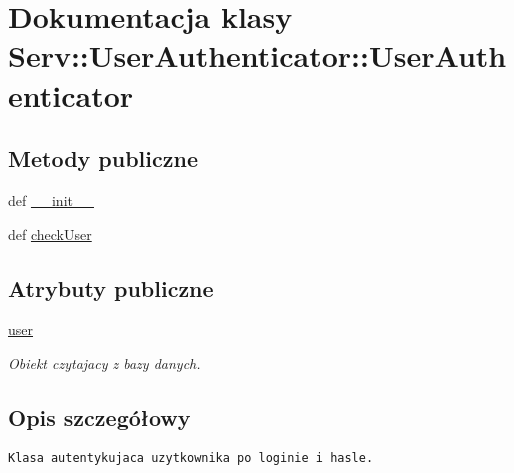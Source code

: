 \hypertarget{class_serv_1_1_user_authenticator_1_1_user_authenticator}{
\section{Dokumentacja klasy Serv::UserAuthenticator::UserAuthenticator}
\label{class_serv_1_1_user_authenticator_1_1_user_authenticator}
}
\subsection*{Metody publiczne}
\begin{CompactItemize}
\item 
def \hyperlink{class_serv_1_1_user_authenticator_1_1_user_authenticator_8da26a197368b560fc5b51a56cf95ccf}{\_\-\_\-init\_\-\_\-}
\item 
def \hyperlink{class_serv_1_1_user_authenticator_1_1_user_authenticator_df35019818eb86047a9c8d1d415bf3e5}{checkUser}
\end{CompactItemize}
\subsection*{Atrybuty publiczne}
\begin{CompactItemize}
\item 
\hypertarget{class_serv_1_1_user_authenticator_1_1_user_authenticator_6f0f3992518647fc45cf548f9c5a79e8}{
\hyperlink{class_serv_1_1_user_authenticator_1_1_user_authenticator_6f0f3992518647fc45cf548f9c5a79e8}{user}}
\label{class_serv_1_1_user_authenticator_1_1_user_authenticator_6f0f3992518647fc45cf548f9c5a79e8}

\begin{CompactList}\small\item\em Obiekt czytajacy z bazy danych. \item\end{CompactList}\end{CompactItemize}


\subsection{Opis szczegółowy}


\footnotesize\begin{verbatim}Klasa autentykujaca uzytkownika po loginie i hasle.\end{verbatim}
\normalsize
 

